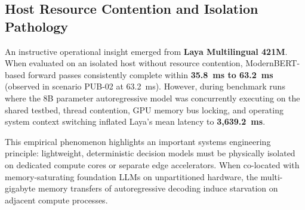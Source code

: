 \documentclass[journal,compsoc]{IEEEtran}
\begin{document}
\subsection{Host Resource Contention and Isolation Pathology}
An instructive operational insight emerged from \textbf{Laya Multilingual 421M}. When evaluated on an isolated host without resource contention, ModernBERT-based forward passes consistently complete within \textbf{35.8~ms to 63.2~ms} (observed in scenario PUB-02 at 63.2~ms). However, during benchmark runs where the 8B parameter autoregressive model was concurrently executing on the shared testbed, thread contention, GPU memory bus locking, and operating system context switching inflated Laya's mean latency to \textbf{3,639.2~ms}.

This empirical phenomenon highlights an important systems engineering principle: lightweight, deterministic decision models must be physically isolated on dedicated compute cores or separate edge accelerators. When co-located with memory-saturating foundation LLMs on unpartitioned hardware, the multi-gigabyte memory transfers of autoregressive decoding induce starvation on adjacent compute processes.
\end{document}
